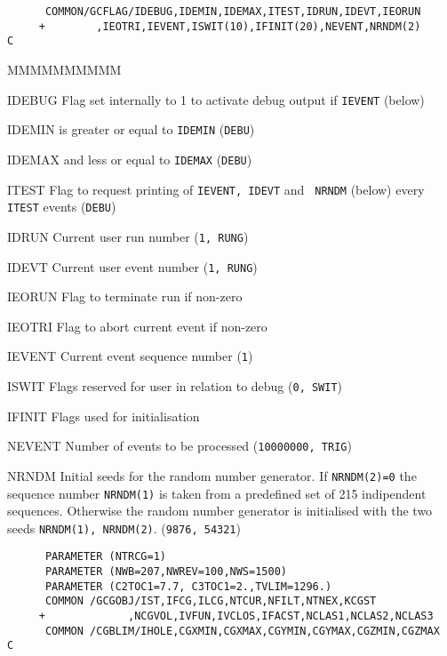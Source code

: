\begin{verbatim}
      COMMON/GCFLAG/IDEBUG,IDEMIN,IDEMAX,ITEST,IDRUN,IDEVT,IEORUN
     +        ,IEOTRI,IEVENT,ISWIT(10),IFINIT(20),NEVENT,NRNDM(2)
C
\end{verbatim}
\begin{DLtt}{MMMMMMMMMM}
\item[IDEBUG]Flag set internally to 1 to activate debug
output if {\tt IEVENT} (below)
\item[IDEMIN]     is greater or equal to {\tt IDEMIN} ({\tt DEBU})
\item[IDEMAX]     and less or equal to {\tt IDEMAX}   ({\tt DEBU})
\item[ITEST]Flag to request printing of {\tt IEVENT, IDEVT} and {\tt
NRNDM} (below) every {\tt ITEST} events ({\tt DEBU})
\item[IDRUN]Current user run number   ({\tt 1, RUNG})
\item[IDEVT]Current user event number  ({\tt 1, RUNG})
\item[IEORUN]Flag to terminate run if non-zero
\item[IEOTRI]Flag to abort current event if non-zero
\item[IEVENT]Current event sequence number ({\tt 1})
\item[ISWIT]Flags reserved for user in relation to debug ({\tt 0, SWIT})
\item[IFINIT]Flags used for initialisation
\item[NEVENT]Number of events to be processed  ({\tt 10000000, TRIG})
\item[NRNDM]Initial seeds for the random number generator. If
{\tt NRNDM(2)=0} the sequence number {\tt NRNDM(1)} is taken from a
predefined set of 215 indipendent sequences. Otherwise the random
number generator is initialised with the two seeds {\tt NRNDM(1), NRNDM(2)}.
({\tt 9876, 54321})
\end{DLtt}
\begin{verbatim}
      PARAMETER (NTRCG=1)
      PARAMETER (NWB=207,NWREV=100,NWS=1500)
      PARAMETER (C2TOC1=7.7, C3TOC1=2.,TVLIM=1296.)
      COMMON /GCGOBJ/IST,IFCG,ILCG,NTCUR,NFILT,NTNEX,KCGST
     +             ,NCGVOL,IVFUN,IVCLOS,IFACST,NCLAS1,NCLAS2,NCLAS3
      COMMON /CGBLIM/IHOLE,CGXMIN,CGXMAX,CGYMIN,CGYMAX,CGZMIN,CGZMAX
C
\end{verbatim}
